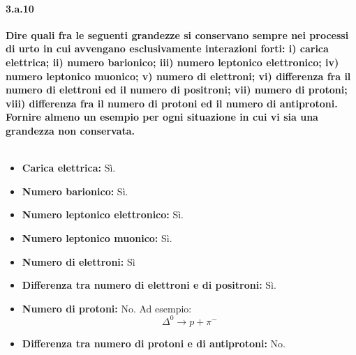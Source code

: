 \documentclass[twoside]{article}
\begin{document}
\paragraph{3.a.10}\textbf{Dire quali fra le seguenti grandezze si conservano sempre nei processi di urto in
cui avvengano esclusivamente interazioni forti: i) carica elettrica; ii) numero
barionico; iii) numero leptonico elettronico; iv) numero leptonico muonico; v)
numero di elettroni; vi) differenza fra il numero di elettroni ed il numero di
positroni; vii) numero di protoni; viii) differenza fra il numero di protoni ed il
numero di antiprotoni. Fornire almeno un esempio per ogni situazione in cui vi
sia una grandezza non conservata.}\\ \\
\begin{itemize}
    \item \textbf{Carica elettrica:} Sì.
    \item \textbf{Numero barionico:} Sì.
    \item \textbf{Numero leptonico elettronico:} Sì.
    \item \textbf{Numero leptonico muonico:} Sì.
    \item \textbf{Numero di elettroni:} Sì
    \item \textbf{Differenza tra numero di elettroni e di positroni:} Sì.
    \item \textbf{Numero di protoni:} No. Ad esempio:
    \begin{equation}
        \Delta^0 \rightarrow p+\pi^-
    \end{equation}
    \item \textbf{Differenza tra numero di protoni e di antiprotoni:} No.
\end{itemize}
\end{document}

